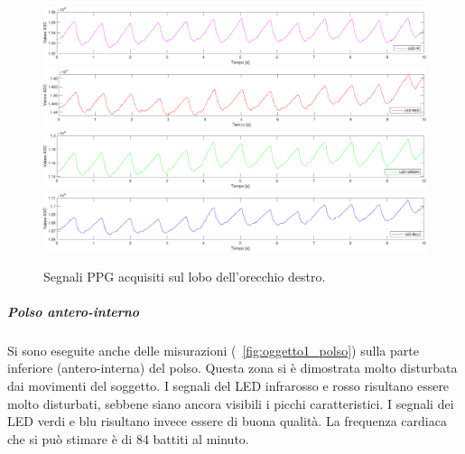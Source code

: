 \begin{figure}[h]
	\centering
	\includegraphics[width=1\linewidth]{ImageFiles/Misure Preliminari/Soggetto 1/lobo_ired}
	\includegraphics[width=1\linewidth]{ImageFiles/Misure Preliminari/Soggetto 1/lobo_red}
	\includegraphics[width=1\linewidth]{ImageFiles/Misure Preliminari/Soggetto 1/lobo_green}
	\includegraphics[width=1\linewidth]{ImageFiles/Misure Preliminari/Soggetto 1/lobo_blu}
	\caption{Segnali PPG acquisiti sul lobo dell'orecchio destro.}
	\label{fig:soggetto1_lobo}
\end{figure}

\clearpage

\subparagraph{Polso antero-interno}

Si sono eseguite anche delle misurazioni (\Fig~\ref{fig:oggetto1_polso}) sulla parte inferiore (antero-interna) del polso. Questa zona si è dimostrata molto disturbata dai movimenti del soggetto. I segnali del LED infrarosso e rosso risultano essere molto disturbati, sebbene siano ancora visibili i picchi caratteristici. I segnali dei LED verdi e blu risultano invece essere di buona qualità. La frequenza cardiaca che si può stimare è di 84 battiti al minuto. 

